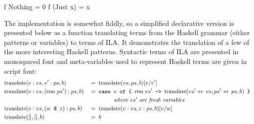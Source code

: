 \documentclass[dissertation.tex]{subfiles}
\begin{document}
{{{            \begin{haskellfigure}
            f Nothing = 0
            f (Just x) = x
            \end{haskellfigure}

            The implementation is somewhat fiddly, so a simplified declarative version is presented below as a
            function translating terms from the Haskell grammar (either patterns or variables) to terms of ILA. It
            demonstrates the translation of a few of the more interesting Haskell patterns. Syntactic terms of ILA
            are presented in monospaced font and meta-variables used to represent Haskell terms are given in script
            font:
            \begin{alignat*}{2}
            \text{translate} & (v:vs, v':ps, b) && =\; \text{translate} (vs, ps, b) [v/v'] \\
            \text{translate} & (v:vs, (\text{con }ps'):ps, b) && =\; \texttt{case } v \texttt{ of \{ }\text{con
            }vs'\texttt{ -> } \text{translate} (vs' +\kern-1.3ex+\kern0.8ex vs, ps' +\kern-1.3ex+\kern0.8ex ps, b) \texttt{ \}} \\
            & && \hspace{1.5cm}\textit{where } vs' \textit{ are fresh variables} \\
            \text{translate} & (v:vs, (w \texttt{ @ } z):ps, b) && =\; \text{translate} (v:vs, z:ps, b) [v/w] \\
            \text{translate} & ([], [], b) && =\; b
            \end{alignat*}

}}}
\end{document}
